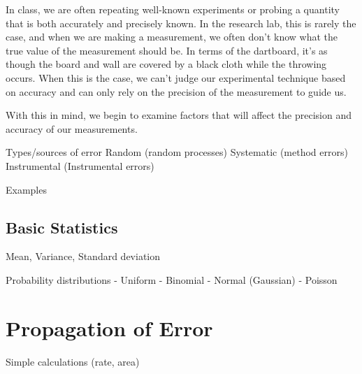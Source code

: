\documentclass[nobib,nofonts,nols,nohyper]{tufte-handout}
\begin{document}
In class, we are often repeating well-known experiments or probing a quantity that is both accurately and precisely known. 
In the research lab, this is rarely the case, and when we are making a measurement, we often don't know what the true value of the measurement should be. 
In terms of the dartboard, it's as though the board and wall are covered by a black cloth while the throwing occurs. 
When this is the case, we can't judge our experimental technique based on accuracy and can only rely on the precision of the measurement to guide us. 

With this in mind, we begin to examine factors that will affect the precision and accuracy of our measurements. 



Types/sources of error
Random (random processes)
Systematic (method errors)
Instrumental (Instrumental errors)

Examples



\subsection{Basic Statistics} %
\label{sub:basic_statistics}

Mean, 
Variance, 
Standard deviation

Probability distributions
- Uniform
- Binomial
- Normal (Gaussian)
- Poisson



\section{Propagation of Error} %
\label{sec:propagation_of_error}

Simple calculations (rate, area)

\nocite{*}
\printbibliography[category=cited]%

\printbibliography[
	title={Further Reading},
	resetnumbers,
	prefixnumbers={F},
	notcategory=cited,
	]
	
\end{document}
